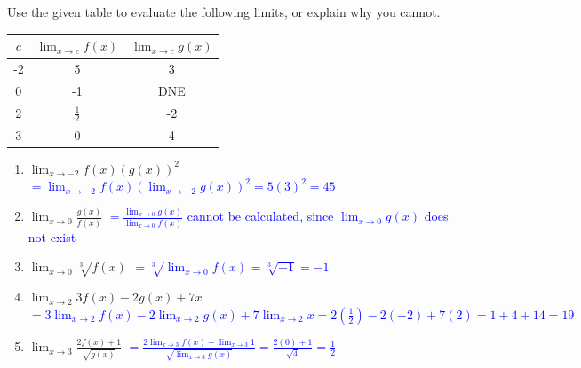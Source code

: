 \documentclass{ximera}
\begin{document}
\begin{exercise}
    Use the given table to evaluate the following limits, or explain why you cannot. \\
  \begin{center}
        \begin{tabular}{c|c|c}
            $c$ & $\lim_{x\rightarrow c}f(x)$ & $\lim_{x\rightarrow c}g(x)$  \\ \hline
            -2 &  5 & 3\\ 
            0 & -1 & DNE\\ 
            2 & $\displaystyle\frac{1}{2}$ & -2\\
            3 & 0 & 4
        \end{tabular}
     \end{center}
     \begin{enumerate}
     \item $\displaystyle\lim_{x\rightarrow -2} f(x)(g(x))^2$ \textcolor{blue}{ $\displaystyle=\lim_{x\rightarrow -2}f(x)(\lim_{x\rightarrow -2} g(x))^2=5(3)^2=45$}
     \item $\displaystyle\lim_{x\rightarrow 0} \frac{g(x)}{f(x)}$ \textcolor{blue}{ $\displaystyle=\frac{\lim_{x\rightarrow 0}g(x)}{\lim_{x\rightarrow 0}f(x)}$ cannot be calculated, since $\lim_{x\rightarrow 0}g(x)$ does not exist}
     \item $\displaystyle \lim_{x\rightarrow 0} \sqrt[3]{f(x)}$ \textcolor{blue}{ $\displaystyle=\sqrt[3]{\lim_{x\rightarrow 0}f(x)}=\sqrt[3]{-1}=-1$}
     \item $\displaystyle \lim_{x\rightarrow 2} 3f(x)-2g(x)+7x$ \textcolor{blue}{ $\displaystyle=3\lim_{x\rightarrow2}f(x)-2\lim_{x\rightarrow 2}g(x)+7\lim_{x\rightarrow2}x=2(\frac{1}{2})-2(-2)+7(2)=1+4+14=19$}
     \item $\displaystyle \lim_{x\rightarrow 3} \frac{2f(x)+1}{\sqrt{g(x)}}$ \textcolor{blue}{ $\displaystyle=\frac{2\lim_{x\rightarrow 3}f(x)+\lim_{x\rightarrow3} 1}{\sqrt{\lim_{x\rightarrow3} g(x)}}=\frac{2(0)+1}{\sqrt{4}}=\frac{1}{2}$}

    \end{enumerate}
\end{exercise}
\end{document}
